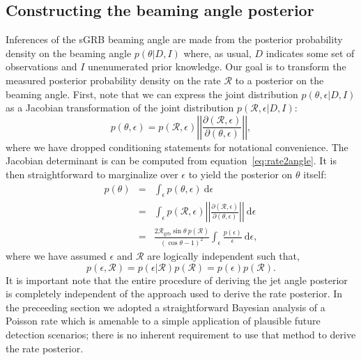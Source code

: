 \documentclass[twocolumn,nofootinbib]{revtex4-1}
\newcommand{\grbrate}{{{\mathcal R}_{\mathrm{grb}}}}
\newcommand{\cbcrate}{{{\mathcal R}}}
\newcommand{\diff}{{\mathrm d}}
\begin{document}
\subsection{Constructing the beaming angle posterior}
Inferences of the \ac{sGRB} beaming angle are made from the posterior
probability density on the beaming angle $p(\theta|D,I)$ where, as
usual, $D$ indicates some set of observations and $I$ unenumerated
prior knowledge.  Our goal is to transform the measured posterior
probability density on the rate $\cbcrate$ to a posterior on the
beaming angle.
%
First, note that we can express the joint distribution
$p(\theta, \epsilon|D,I)$ as a Jacobian transformation of the joint
distribution $p(\cbcrate, \epsilon|D,I)$:
\begin{equation}
p(\theta,\epsilon) = p(\cbcrate,\epsilon)
\left\lvert\left\lvert
\frac{\partial(\cbcrate,\epsilon)}{\partial(\theta,\epsilon)}
\right\rvert\right\rvert,
\end{equation}
%
where we have dropped conditioning statements for notational convenience.
The Jacobian determinant is can be  computed from equation~\ref{eq:rate2angle}.
It is then straightforward to marginalize over $\epsilon$ to yield the posterior on $\theta$ itself:
%
\begin{eqnarray}
    \label{eq:beam_posterior}
    p(\theta) & = & \int_{\epsilon} p(\theta,\epsilon)~\diff \epsilon\\
              & = & \int_{\epsilon} p(\cbcrate,\epsilon)
    \left\lvert\left\lvert
    \frac{\partial(\cbcrate,\epsilon)}{\partial(\theta,\epsilon)}
    \right\rvert\right\rvert~\diff \epsilon \\
              & = & \frac{2\grbrate \sin
\theta~p(\cbcrate)}{(\cos\theta-1)^2}\int_{\epsilon}
\frac{p(\epsilon)}{\epsilon} ~\diff \epsilon,
\end{eqnarray}
%
where we have assumed $\epsilon$ and $\cbcrate$ are logically independent such that,
\begin{equation}
p(\epsilon,\cbcrate) = p(\epsilon|\cbcrate)p(\cbcrate) = p(\epsilon)p(\cbcrate).
\end{equation}
%
It is important note that the entire procedure of deriving the jet
angle posterior is completely independent of the approach used to
derive the rate posterior.  In the preceeding section we adopted a
straightforward Bayesian analysis of a Poisson rate which is amenable
to a simple application of plausible future detection scenarios; there
is no inherent requirement to use that method to derive the rate
posterior.
\end{document}
